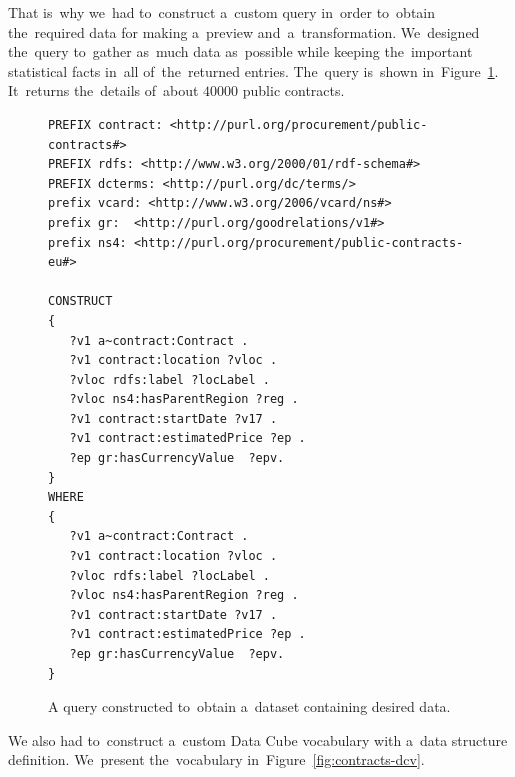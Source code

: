 That is~why we~had to~construct a~custom query in~order to~obtain the~required 
data for making a~preview and~a~transformation. We~designed the~query to~gather as~much data as~possible while keeping the~important statistical facts in~all of~the~returned entries. The~query is~shown in~Figure~\ref{fig:contracts-query}. It~returns the~details of~about $40000$ public 
contracts.

\begin{figure}
  \scriptsize
  \begin{verbatim}
PREFIX contract: <http://purl.org/procurement/public-contracts#>
PREFIX rdfs: <http://www.w3.org/2000/01/rdf-schema#>
PREFIX dcterms: <http://purl.org/dc/terms/>
prefix vcard: <http://www.w3.org/2006/vcard/ns#> 
prefix gr:	<http://purl.org/goodrelations/v1#> 
prefix ns4:	<http://purl.org/procurement/public-contracts-eu#>

CONSTRUCT 
{
   ?v1 a~contract:Contract .
   ?v1 contract:location ?vloc .
   ?vloc rdfs:label ?locLabel .
   ?vloc ns4:hasParentRegion ?reg .
   ?v1 contract:startDate ?v17 .
   ?v1 contract:estimatedPrice ?ep .
   ?ep gr:hasCurrencyValue	?epv.
}
WHERE
{
   ?v1 a~contract:Contract .
   ?v1 contract:location ?vloc .
   ?vloc rdfs:label ?locLabel .
   ?vloc ns4:hasParentRegion ?reg .
   ?v1 contract:startDate ?v17 .
   ?v1 contract:estimatedPrice ?ep .
   ?ep gr:hasCurrencyValue	?epv.
}
  \end{verbatim}
  \caption{A query constructed to~obtain a~dataset containing desired data.}
  \label{fig:contracts-query}
\end{figure}

We also had to~construct a~custom Data Cube vocabulary with a~data structure 
definition. We~present the~vocabulary in~Figure~\ref{fig:contracts-dcv}.

